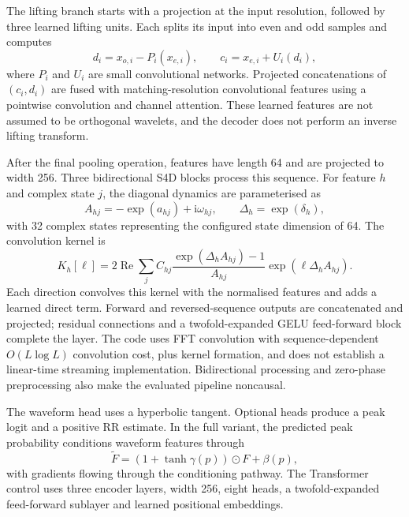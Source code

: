 \documentclass[11pt,a4paper]{article}
\begin{document}
The lifting branch starts with a projection at the input resolution, followed by three
learned lifting units. Each splits its input into even and odd samples and computes
\begin{equation}
d_i=x_{o,i}-P_i(x_{e,i}),\qquad c_i=x_{e,i}+U_i(d_i),
\end{equation}
where $P_i$ and $U_i$ are small convolutional networks. Projected concatenations of
$(c_i,d_i)$ are fused with matching-resolution convolutional features using a pointwise
convolution and channel attention. These learned features are not assumed to be orthogonal
wavelets, and the decoder does not perform an inverse lifting transform.

After the final pooling operation, features have length 64 and are projected to width 256.
Three bidirectional S4D blocks process this sequence. For feature $h$ and complex state $j$,
the diagonal dynamics are parameterised as
\begin{equation}
A_{hj}=-\exp(a_{hj})+\mathrm{i}\omega_{hj},\qquad
\Delta_h=\exp(\delta_h),
\end{equation}
with 32 complex states representing the configured state dimension of 64. The convolution
kernel is
\begin{equation}
K_h[\ell]=2\operatorname{Re}\sum_j C_{hj}
\frac{\exp(\Delta_h A_{hj})-1}{A_{hj}}
\exp(\ell\Delta_h A_{hj}).
\label{eq:s4d}
\end{equation}
Each direction convolves this kernel with the normalised features and adds a learned direct
term. Forward and reversed-sequence outputs are concatenated and projected; residual
connections and a twofold-expanded GELU feed-forward block complete the layer. The code uses
FFT convolution with sequence-dependent $O(L\log L)$ convolution cost, plus kernel formation,
and does not establish a linear-time streaming implementation. Bidirectional processing and
zero-phase preprocessing also make the evaluated pipeline noncausal.

The waveform head uses a hyperbolic tangent. Optional heads produce a peak logit and a
positive RR estimate. In the full variant, the predicted peak probability conditions waveform
features through
\begin{equation}
\widetilde F=(1+\tanh\gamma(p))\odot F+\beta(p),
\end{equation}
with gradients flowing through the conditioning pathway. The Transformer control uses three
encoder layers, width 256, eight heads, a twofold-expanded feed-forward sublayer and learned
positional embeddings.
\end{document}

